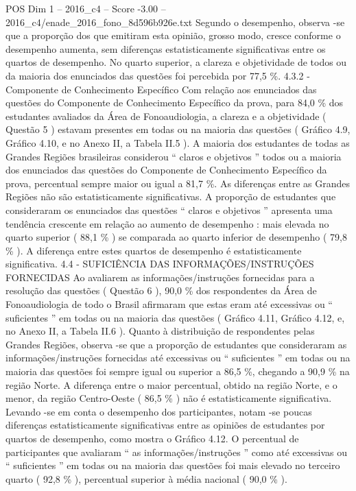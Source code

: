 \begin{textsample}{POS Dim 1 – 2016\_c4 – Score -3.00 – 2016\_c4/enade\_2016\_fono\_8d596b926e.txt}
Segundo o desempenho, observa -se que a proporção dos que emitiram esta opinião, grosso modo, cresce conforme o desempenho aumenta, sem diferenças estatisticamente significativas entre os quartos de desempenho.
No quarto superior, a clareza e objetividade de todos ou da maioria dos enunciados das questões foi percebida por 77,5 \%. 4.3.2 - Componente de Conhecimento Específico Com relação aos enunciados das questões do Componente de Conhecimento Específico da prova, para 84,0 \% dos estudantes avaliados da Área de Fonoaudiologia, a clareza e a objetividade ( Questão 5 ) estavam presentes em todas ou na maioria das questões ( Gráfico 4.9, Gráfico 4.10, e no Anexo II, a Tabela II.5 ).
A maioria dos estudantes de todas as Grandes Regiões brasileiras considerou “ claros e objetivos ” todos ou a maioria dos enunciados das questões do Componente de Conhecimento Específico da prova, percentual sempre maior ou igual a 81,7 \%.
As diferenças entre as Grandes Regiões não são estatisticamente significativas.
A proporção de estudantes que consideraram os enunciados das questões “ claros e objetivos ” apresenta uma tendência crescente em relação ao aumento de desempenho : mais elevada no quarto superior ( 88,1 \% ) se comparada ao quarto inferior de desempenho ( 79,8 \% ).
A diferença entre estes quartos de desempenho é estatisticamente significativa. 4.4 - SUFICIÊNCIA DAS INFORMAÇÕES/INSTRUÇÕES FORNECIDAS Ao avaliarem as informações/instruções fornecidas para a resolução das questões ( Questão 6 ), 90,0 \% dos respondentes da Área de Fonoaudiologia de todo o Brasil afirmaram que estas eram até excessivas ou “ suficientes ” em todas ou na maioria das questões ( Gráfico 4.11, Gráfico 4.12, e, no Anexo II, a Tabela II.6 ).
Quanto à distribuição de respondentes pelas Grandes Regiões, observa -se que a proporção de estudantes que consideraram as informações/instruções fornecidas até excessivas ou “ suficientes ” em todas ou na maioria das questões foi sempre igual ou superior a 86,5 \%, chegando a 90,9 \% na região Norte.
A diferença entre o maior percentual, obtido na região Norte, e o menor, da região Centro-Oeste ( 86,5 \% ) não é estatisticamente significativa.
Levando -se em conta o desempenho dos participantes, notam -se poucas diferenças estatisticamente significativas entre as opiniões de estudantes por quartos de desempenho, como mostra o Gráfico 4.12.
O percentual de participantes que avaliaram “ as informações/instruções ” como até excessivas ou “ suficientes ” em todas ou na maioria das questões foi mais elevado no terceiro quarto ( 92,8 \% ), percentual superior à média nacional ( 90,0 \% ).

\end{textsample}
